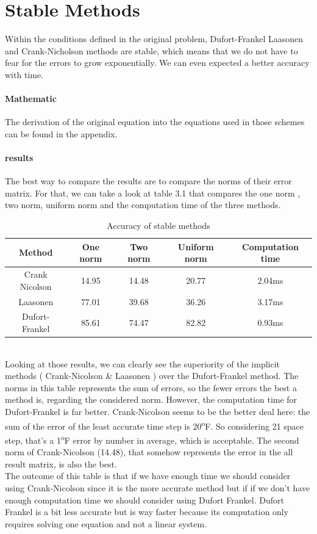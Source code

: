 \documentclass[12pt, a4paper]{report}
\begin{document}
\section{Stable Methods}
Within the conditions defined in the original problem, Dufort-Frankel Laasonen and Crank-Nicholson methods are stable, which means that we do not have to fear for the errors to grow exponentially. We can even expected a better accuracy with time.
\paragraph{Mathematic} The derivation of the original equation into the equations used in those schemes can be found in the appendix.
\paragraph{results}
The best way to compare the results are to compare the norms of their error matrix. For that, we can take a look at table 3.1 that compares the one norm , two norm, uniform norm and the computation time of the three methods.\\
\begin{table}[ht]
\centering
\begin{tabular}{c c c c c}
\toprule
Method & One norm & Two norm & Uniform norm & Computation time \\
\midrule
Crank Nicolson & 14.95 & 14.48 & 20.77 & 2.04ms\\
Laasonen &77.01&39.68&36.26&3.17ms\\
Dufort-Frankel & 85.61 & 74.47 & 82.82 & 0.93ms\\
\end{tabular}
\caption{Accuracy of stable methods}
\end{table}\\
Looking at those results, we can clearly see the superiority of the implicit methods ( Crank-Nicolson \& Laasonen ) over the Dufort-Frankel method. The norms in this table represents the sum of errors, so the fewer errors the best a method is, regarding the considered norm. However, the computation time for Dufort-Frankel is far better. Crank-Nicolson seems to be the better deal here: the sum of the error of the least accurate time step is 20\textsuperscript{o}F. So considering 21 space step, that's a 1\textsuperscript{o}F error by number in average, which is acceptable. The second norm of Crank-Nicolson (14.48), that somehow represents the error in the all result matrix, is also the best.\\
The outcome of this table is that if we have enough time we should consider using Crank-Nicolson since it is the more accurate method but if if we don't have enough computation time we should consider using Dufort Frankel. Dufort Frankel is a bit less accurate but is way faster because its computation only requires solving one equation and not a linear system.
\end{document}
